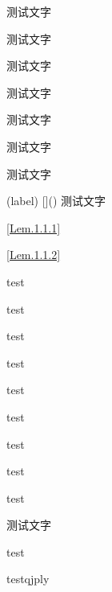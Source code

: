 \begin{Definition}
	测试文字
\end{Definition}

\begin{Lemma}
	测试文字
\end{Lemma}

\begin{Theorem}
	测试文字
\end{Theorem}

\begin{Axiom}
	测试文字
\end{Axiom}


\begin{Proposition}
	测试文字
\end{Proposition}


\begin{Corollary}
	测试文字
\end{Corollary}

\begin{Lemma}
	测试文字
\end{Lemma}


\begin{Lemma*}(label)
	[]()
	测试文字
\end{Lemma*}

\pageref{Lem.1.1.1}
\ref{Lem.1.1.1}


\pageref{Lem.1.1.2}
\ref{Lem.1.1.2}

\pageref{label}





\begin{UnnumberedItem}[3]
\item test
\item test
\item test
\item test
\item test
\item test
\item test
\item test
\item test
\end{UnnumberedItem}

\begin{NumberedItem}
	\item 测试文字
	\item test
	\item testqjply
\end{NumberedItem}



\begin{Block}
	\lipsum
\end{Block}































